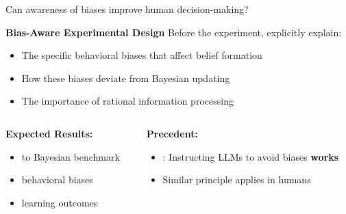 \begin{frame}{Can awareness of biases improve human decision-making?}
    
    \begin{block}{\textbf{Bias-Aware Experimental Design}}
		Before the experiment, explicitly explain:
        \begin{itemize}
            \item The specific behavioral biases that affect belief formation
            \item How these biases deviate from Bayesian updating
            \item The importance of rational information processing
        \end{itemize}
    \end{block}
    
	\bigskip 
    \begin{columns}
        \begin{column}{0.5\textwidth}
            \textbf{Expected Results:}
            \begin{itemize}
                \item {} to Bayesian benchmark
                \item {} behavioral biases
                \item {} learning outcomes
            \end{itemize}
        \end{column}

		\medskip 
        \begin{column}{0.5\textwidth}
            \textbf{Precedent:}
            \begin{itemize}
                \item \cite{bowen2024measuring}: Instructing LLMs to avoid biases \textbf{works}
                \item Similar principle applies in humans
            \end{itemize}
        \end{column}
    \end{columns}
    
\end{frame}


